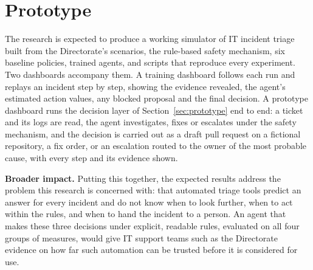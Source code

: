 \section{Prototype}

The research is expected to produce a working simulator of IT incident triage built from the Directorate's scenarios, the rule-based safety mechanism, six baseline policies, trained agents, and scripts that reproduce every experiment. Two dashboards accompany them. A training dashboard follows each run and replays an incident step by step, showing the evidence revealed, the agent's estimated action values, any blocked proposal and the final decision. A prototype dashboard runs the decision layer of Section~\ref{sec:prototype} end to end: a ticket and its logs are read, the agent investigates, fixes or escalates under the safety mechanism, and the decision is carried out as a draft pull request on a fictional repository, a fix order, or an escalation routed to the owner of the most probable cause, with every step and its evidence shown.

\textbf{Broader impact.} Putting this together, the expected results address the problem this research is concerned with: that automated triage tools predict an answer for every incident and do not know when to look further, when to act within the rules, and when to hand the incident to a person. An agent that makes these three decisions under explicit, readable rules, evaluated on all four groups of measures, would give IT support teams such as the Directorate evidence on how far such automation can be trusted before it is considered for use.
